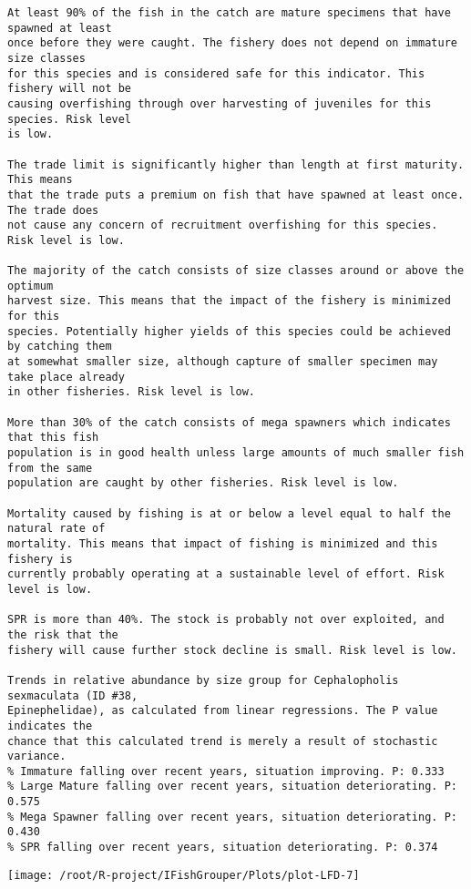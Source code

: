 \documentclass{report}\usepackage[]{graphicx}\usepackage[]{color}
\makeatletter
\def\maxwidth{ %
  \ifdim\Gin@nat@width>\linewidth
    \linewidth
  \else
    \Gin@nat@width
  \fi
}
\newenvironment{kframe}{%
 \def\at@end@of@kframe{}%
 \ifinner\ifhmode%
  \def\at@end@of@kframe{\end{minipage}}%
  \begin{minipage}{\columnwidth}%
 \fi\fi%
 \def\FrameCommand##1{\hskip\@totalleftmargin \hskip-\fboxsep
 \colorbox{shadecolor}{##1}\hskip-\fboxsep
     \hskip-\linewidth \hskip-\@totalleftmargin \hskip\columnwidth}%
 \MakeFramed {\advance\hsize-\width
   \@totalleftmargin\z@ \linewidth\hsize
   \@setminipage}}%
 {\par\unskip\endMakeFramed%
 \at@end@of@kframe}
\newenvironment{knitrout}{}{} %
\makeatother
\begin{document}
\begin{knitrout}
\begin{kframe}
\begin{verbatim}
At least 90% of the fish in the catch are mature specimens that have spawned at least
once before they were caught. The fishery does not depend on immature size classes
for this species and is considered safe for this indicator. This fishery will not be
causing overfishing through over harvesting of juveniles for this species. Risk level
is low.

The trade limit is significantly higher than length at first maturity.  This means
that the trade puts a premium on fish that have spawned at least once. The trade does
not cause any concern of recruitment overfishing for this species. Risk level is low.

The majority of the catch consists of size classes around or above the optimum
harvest size. This means that the impact of the fishery is minimized for this
species. Potentially higher yields of this species could be achieved by catching them
at somewhat smaller size, although capture of smaller specimen may take place already
in other fisheries. Risk level is low.

More than 30% of the catch consists of mega spawners which indicates that this fish
population is in good health unless large amounts of much smaller fish from the same
population are caught by other fisheries. Risk level is low.
 
Mortality caused by fishing is at or below a level equal to half the natural rate of
mortality. This means that impact of fishing is minimized and this fishery is
currently probably operating at a sustainable level of effort. Risk level is low.
 
SPR is more than 40%. The stock is probably not over exploited, and the risk that the
fishery will cause further stock decline is small. Risk level is low.
 
Trends in relative abundance by size group for Cephalopholis sexmaculata (ID #38,
Epinephelidae), as calculated from linear regressions. The P value indicates the
chance that this calculated trend is merely a result of stochastic variance.
% Immature falling over recent years, situation improving. P: 0.333
% Large Mature falling over recent years, situation deteriorating. P: 0.575
% Mega Spawner falling over recent years, situation deteriorating. P: 0.430
% SPR falling over recent years, situation deteriorating. P: 0.374
\end{verbatim}
\end{kframe}
\texttt{[image: /root/R-project/IFishGrouper/Plots/plot-LFD-7]} 


\end{knitrout}
\end{document}
